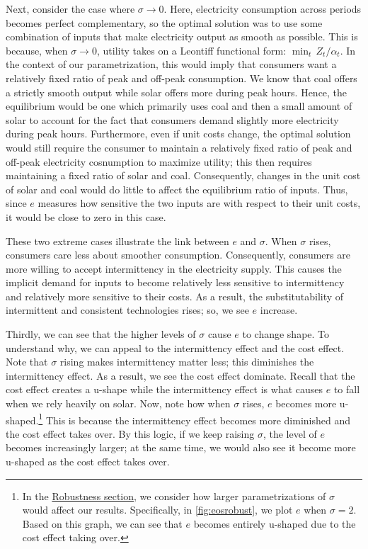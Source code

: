 \documentclass[11pt,a4paper,leqno]{extarticle}
\begin{document}
	Next, consider the case where $\sigma \to 0$. Here, electricity consumption across periods becomes perfect complementary, so  the optimal solution was to use some combination of inputs that make electricity output as smooth as possible. This is because, when $\sigma \to 0$, utility takes on a Leontiff functional form: $\min_t \, Z_t/\alpha_t$. In the context of our parametrization, this would  imply that consumers want a relatively fixed ratio of peak and off-peak consumption. We know that coal offers a strictly smooth output while solar offers more during peak hours. Hence, the equilibrium would be one which primarily uses coal and then a small amount of solar to account for the fact that consumers demand slightly more electricity during peak hours. Furthermore, even if unit costs change, the optimal solution would still require the consumer to maintain a relatively fixed ratio of peak and off-peak electricity cosnumption to maximize utility; this then requires maintaining a fixed ratio of solar and coal. Consequently, changes in the unit cost of solar and coal would do little to affect the equilibrium ratio of inputs. Thus, since $e$ measures how sensitive the two inputs are with respect to their unit costs, it would be close to zero in this case. 
	
	These two extreme cases illustrate the link between $e$ and $\sigma$. When $\sigma$ rises, consumers care less about smoother consumption. Consequently, consumers are more willing to accept intermittency in the electricity supply. This causes the implicit demand for inputs to become relatively less sensitive to intermittency and relatively more sensitive to their costs. As a result, the substitutability of intermittent and consistent technologies rises; so, we see $e$ increase. 
	
	Thirdly, we can see that the higher levels of $\sigma$ cause $e$ to change shape. To understand why, we can appeal to the intermittency effect and the cost effect. Note that $\sigma$ rising makes intermittency matter less; this diminishes the intermittency effect. As a result, we see the cost effect dominate. Recall that the cost effect creates a u-shape while the intermittency effect is what causes $e$ to fall when we rely heavily on solar. Now, note how when $\sigma$ rises,  $e$ becomes more u-shaped.\footnote{ In the \hyperref[sec:robust]{Robustness section}, we consider how larger parametrizations of $\sigma$ would affect our results. Specifically, in \autoref{fig:eosrobust}, we plot $e$ when $\sigma = 2$. Based on this graph, we can see that $e$ becomes entirely u-shaped due to the cost effect taking over.  } This is because the intermittency effect becomes more diminished and the cost effect takes over.  By this logic, if we keep raising $\sigma$, the level of $e$ becomes increasingly larger; at the same time, we would also see it become more u-shaped as the cost effect takes over. 
	
\end{document}
